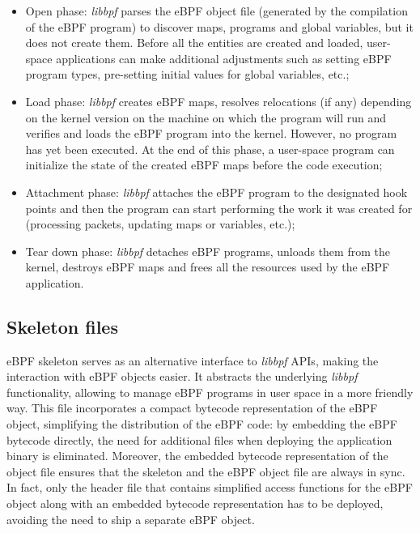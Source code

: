 \begin{itemize}
	\item Open phase: \textit{libbpf} parses the eBPF object file (generated by the
		compilation of the eBPF program) to discover maps, programs and global variables, but it does not create them.
		Before all the entities are created and loaded, user-space applications can make additional adjustments such as setting eBPF program types, pre-setting initial values for global variables, etc.;
	\item Load phase: \textit{libbpf} creates eBPF maps, resolves relocations (if
		any) depending on the kernel version on the machine on which the program will run and verifies and loads the eBPF program into the kernel.
		However, no program has yet been executed.
		At the end of this phase, a user-space program can initialize the state of the created eBPF maps before the code execution;
	\item Attachment phase: \textit{libbpf} attaches the eBPF program to the
		designated hook points and then the program can start performing the work it was created for (processing packets, updating maps or variables, etc.);
	\item Tear down phase: \textit{libbpf} detaches eBPF programs, unloads them from
		the kernel, destroys eBPF maps and frees all the resources used by the eBPF application.
\end{itemize}

\subsection{Skeleton files}

eBPF skeleton serves as an alternative interface to \textit{libbpf} APIs, making the interaction with eBPF objects easier. 
It abstracts the underlying \textit{libbpf} functionality, allowing to manage eBPF programs in user space in a more friendly way. 
This file incorporates a compact bytecode representation of the eBPF object, simplifying the distribution of the eBPF code: by embedding the eBPF bytecode directly, the need for additional files when deploying the application binary is eliminated.
Moreover, the embedded bytecode representation of the object file ensures that the skeleton and the eBPF object file are always in sync.
In fact, only the header file that contains simplified access functions for the eBPF object along with an embedded bytecode representation has to be deployed, avoiding the need to ship a separate eBPF object.

